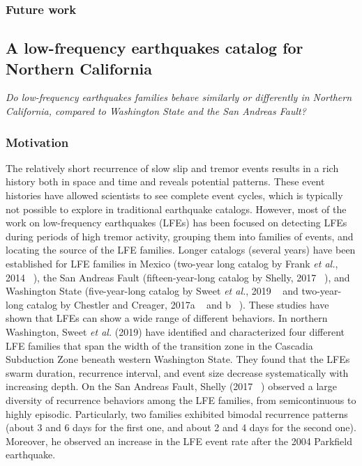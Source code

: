 \documentclass[letterpaper, 12pt]{article}
\begin{document}
\subsubsection*{Future work}

\subsection{A low-frequency earthquakes catalog for Northern California}

\textit{Do low-frequency earthquakes families behave similarly or differently in Northern California, compared to Washington State and the San Andreas Fault?}

\subsubsection*{Motivation}

The relatively short recurrence of slow slip and tremor events results in a rich history both in space and time and reveals potential patterns.  These event histories have allowed scientists to see complete event cycles, which is typically not possible to explore in traditional earthquake catalogs. However, most of the work on low-frequency earthquakes (LFEs) has been focused on detecting LFEs during periods of high tremor activity, grouping them into families of events, and locating the source of the LFE families. Longer catalogs (several years) have been established for LFE families in Mexico (two-year long catalog by Frank \textit{et al.}, 2014 ~\cite{FRA_2014}), the San Andreas Fault (fifteen-year-long catalog by Shelly, 2017 ~\cite{SHE_2017}), and Washington State (five-year-long catalog by Sweet \textit{et al.}, 2019 ~\cite{SWE_2019} and two-year-long catalog by Chestler and Creager, 2017a ~\cite{CHE_2017_JGR} and b ~\cite{CHE_2017_G3}). These studies have shown that LFEs can show a wide range of different behaviors. In northern Washington, Sweet \textit{et al.} (2019) have identified and characterized four different LFE families that span the width of the transition zone in the Cascadia Subduction Zone beneath western Washington State. They found that the LFEs swarm duration, recurrence interval, and event size decrease systematically with increasing depth. On the San Andreas Fault, Shelly (2017 ~\cite{SHE_2017}) observed a large diversity of recurrence behaviors among the LFE families, from semicontinuous to highly episodic. Particularly, two families exhibited bimodal recurrence patterns (about 3 and 6 days for the first one, and about 2 and 4 days for the second one). Moreover, he observed an increase in the LFE event rate after the 2004 Parkfield earthquake. \\
\end{document}
